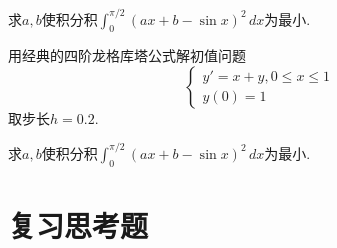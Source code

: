 \documentclass[lang=cn,newtx,12pt,scheme=chinese]{elegantbook}
\begin{document}
\begin{solution}
	求$a,b$使积分积$\int_{0}^{\pi/2}(ax+b-\sin x)^2 \, dx$为最小.
\end{solution}
\begin{exercise}
	用经典的四阶龙格库塔公式解初值问题\[ 
	\begin{cases}
		y'=x+y,0\leq x\leq 1\\
		y(0)=1
	\end{cases}
	\]
	取步长$h=0.2$.
\end{exercise}

\begin{solution}
	求$a,b$使积分积$\int_{0}^{\pi/2}(ax+b-\sin x)^2 \, dx$为最小.
\end{solution}
\section{复习思考题}
\end{document}
